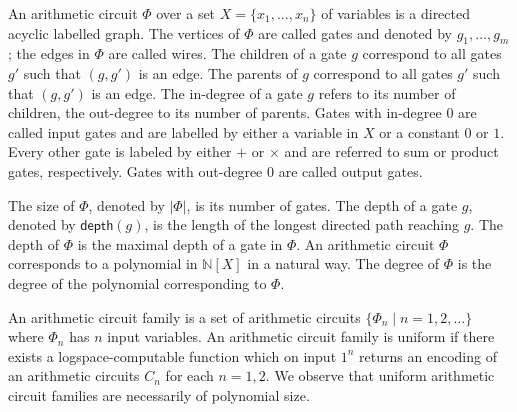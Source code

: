 An arithmetic circuit $\Phi$ over a set $X=\{x_1,\ldots,x_n\}$ of variables is a directed
acyclic labelled graph. The vertices of $\Phi$ are called gates and denoted by $g_1,\ldots,g_m$;
the edges in $\Phi$ are called wires. The children of a gate $g$ correspond to all gates
$g'$ such that $(g,g')$ is an edge. The parents of $g$ correspond to all gates $g'$ 
such that $(g,g')$ is an edge. The in-degree of a gate $g$ refers to its number of children,
the out-degree to its number of parents. Gates with in-degree $0$ are called input gates
and are labelled by either a variable in $X$ or a constant $0$ or $1$. Every other gate
is labeled by either $+$ or $\times$ and are referred to sum or product gates, respectively.
Gates with out-degree $0$ are called output gates.


The size of $\Phi$, denoted by $|\Phi|$, is its number of gates. The depth of a gate $g$, denoted
by $\mathsf{depth}(g)$, is the length of the longest directed path reaching $g$. The depth of $\Phi$
is the maximal depth of a gate in $\Phi$. An arithmetic circuit $\Phi$ corresponds to a polynomial in $\mathbb{N}[X]$ in a natural way. The degree of $\Phi$ is the degree of the polynomial corresponding to $\Phi$.

An arithmetic circuit family is a set of arithmetic circuits $\{\Phi_n\mid n=1,2,\ldots\}$ where $\Phi_n$ has $n$ input variables. An arithmetic circuit family is uniform if there exists a logspace-computable function
which on input $1^n$ returns an encoding of an arithmetic circuits $C_n$ for each $n=1,2$. We observe that
uniform arithmetic circuit families are necessarily of polynomial size.
